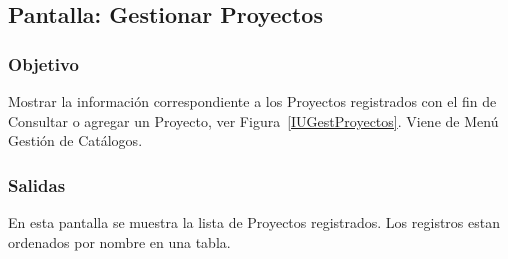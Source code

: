 \subsection{Pantalla: Gestionar Proyectos}

\subsubsection{Objetivo}
Mostrar la información correspondiente a los Proyectos registrados con el fin de Consultar o agregar un Proyecto, ver Figura~\ref{IUGestProyectos}. Viene de Menú Gestión de Catálogos.


\subsubsection{Salidas}
En esta pantalla se muestra la lista de Proyectos registrados. Los registros estan ordenados por nombre en una tabla.

